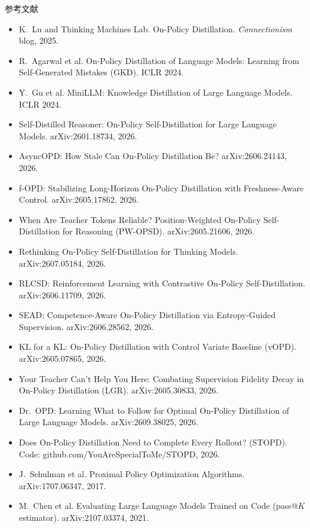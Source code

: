 \documentclass[aspectratio=169,11pt]{beamer}
\begin{document}
\begin{frame}[allowframebreaks]{参考文献}
\footnotesize
\begin{itemize}
  \item K.~Lu and Thinking Machines Lab. On-Policy Distillation. \emph{Connectionism} blog, 2025.
  \item R.~Agarwal et al. On-Policy Distillation of Language Models: Learning from Self-Generated Mistakes (GKD). ICLR 2024.
  \item Y.~Gu et al. MiniLLM: Knowledge Distillation of Large Language Models. ICLR 2024.
  \item Self-Distilled Reasoner: On-Policy Self-Distillation for Large Language Models. arXiv:2601.18734, 2026.
  \item AsyncOPD: How Stale Can On-Policy Distillation Be? arXiv:2606.24143, 2026.
  \item f-OPD: Stabilizing Long-Horizon On-Policy Distillation with Freshness-Aware Control. arXiv:2605.17862, 2026.
  \item When Are Teacher Tokens Reliable? Position-Weighted On-Policy Self-Distillation for Reasoning (PW-OPSD). arXiv:2605.21606, 2026.
  \item Rethinking On-Policy Self-Distillation for Thinking Models. arXiv:2607.05184, 2026.
  \item RLCSD: Reinforcement Learning with Contrastive On-Policy Self-Distillation. arXiv:2606.11709, 2026.
  \item SEAD: Competence-Aware On-Policy Distillation via Entropy-Guided Supervision. arXiv:2606.28562, 2026.
  \item KL for a KL: On-Policy Distillation with Control Variate Baseline (vOPD). arXiv:2605.07865, 2026.
  \item Your Teacher Can't Help You Here: Combating Supervision Fidelity Decay in On-Policy Distillation (LGR). arXiv:2605.30833, 2026.
  \item Dr.\ OPD: Learning What to Follow for Optimal On-Policy Distillation of Large Language Models. arXiv:2609.38025, 2026.
  \item Does On-Policy Distillation Need to Complete Every Rollout? (STOPD). Code: github.com/YouAreSpecialToMe/STOPD, 2026.
  \item J.~Schulman et al. Proximal Policy Optimization Algorithms. arXiv:1707.06347, 2017.
  \item M.~Chen et al. Evaluating Large Language Models Trained on Code (pass@$K$ estimator). arXiv:2107.03374, 2021.

\end{itemize}
\end{frame}
\end{document}
